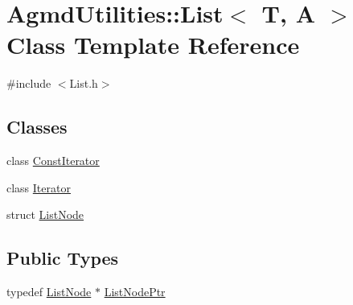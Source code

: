 \hypertarget{class_agmd_utilities_1_1_list}{\section{Agmd\+Utilities\+:\+:List$<$ T, A $>$ Class Template Reference}
\label{class_agmd_utilities_1_1_list}
}


{\ttfamily \#include $<$List.\+h$>$}

\subsection*{Classes}
\begin{DoxyCompactItemize}
\item 
class \hyperlink{class_agmd_utilities_1_1_list_1_1_const_iterator}{Const\+Iterator}
\item 
class \hyperlink{class_agmd_utilities_1_1_list_1_1_iterator}{Iterator}
\item 
struct \hyperlink{struct_agmd_utilities_1_1_list_1_1_list_node}{List\+Node}
\end{DoxyCompactItemize}
\subsection*{Public Types}
\begin{DoxyCompactItemize}
\item 
typedef \hyperlink{struct_agmd_utilities_1_1_list_1_1_list_node}{List\+Node} $\ast$ \hyperlink{class_agmd_utilities_1_1_list_a41bf36081cbb28f08e4e4a9f6f45f4f6}{List\+Node\+Ptr}
\end{DoxyCompactItemize}
